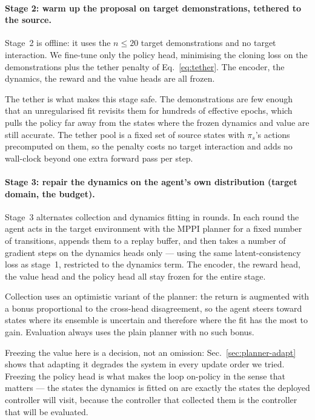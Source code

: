 \paragraph{Stage 2: warm up the proposal on target demonstrations, tethered to
the source.}
Stage~2 is offline: it uses the $n \le 20$ target demonstrations and no target
interaction. We fine-tune only the policy head, minimising the cloning loss on
the demonstrations plus the tether penalty of Eq.~\ref{eq:tether}. The
encoder, the dynamics, the reward and the value heads are all frozen.

The tether is what makes this stage safe. The demonstrations are few enough that
an unregularised fit revisits them for hundreds of effective epochs, which pulls
the policy far away from the states where the frozen dynamics and value are
still accurate. The tether pool is a fixed set of source states with
$\pi_s$'s actions precomputed on them, so the penalty costs no target
interaction and adds no wall-clock beyond one extra forward pass per step.

\paragraph{Stage 3: repair the dynamics on the agent's own distribution (target
domain, the budget).}
Stage~3 alternates collection and dynamics fitting in rounds. In each round the
agent acts in the target environment with the MPPI planner for a fixed number of
transitions, appends them to a replay buffer, and then takes a number of
gradient steps on the dynamics heads only --- using the same latent-consistency
loss as stage~1, restricted to the dynamics term. The encoder, the reward head,
the value head and the policy head all stay frozen for the entire stage.

Collection uses an optimistic variant of the planner: the return is augmented
with a bonus proportional to the cross-head disagreement, so the agent steers
toward states where its ensemble is uncertain and therefore where the fit has
the most to gain. Evaluation always uses the plain planner with no such bonus.

Freezing the value here is a decision, not an omission: Sec.~\ref{sec:planner-adapt}
shows that adapting it degrades the system in every update order we tried.
Freezing the policy head is what makes the loop on-policy in the sense that
matters --- the states the dynamics is fitted on are exactly the states the
deployed controller will visit, because the controller that collected them is
the controller that will be evaluated.

